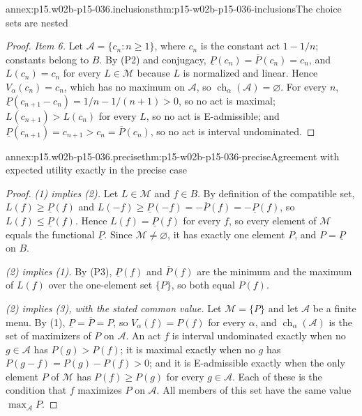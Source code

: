 \begin{annexitem}{annex:p15.w02b-p15-036.inclusions}{thm:p15-w02b-p15-036-inclusions}{The choice sets are nested}
\begin{proof}
\emph{Item 6.} Let \(\mathcal A=\{c_n:n\geq1\}\), where \(c_n\) is the
constant act \(1-1/n\); constants belong to \(B\). By (P2) and
conjugacy, \(\underline P(c_n)=\overline P(c_n)=c_n\), and
\(L(c_n)=c_n\) for every \(L\in\mathcal M\) because \(L\) is normalized and
linear. Hence \(V_\alpha(c_n)=c_n\), which has no maximum on
\(\mathcal A\), so \(\operatorname{ch}_\alpha(\mathcal A)=\varnothing\).
For every \(n\), \(\underline P(c_{n+1}-c_n)=1/n-1/(n+1)>0\), so no act is
maximal; \(L(c_{n+1})>L(c_n)\) for every \(L\), so no act is E-admissible;
and \(\underline P(c_{n+1})=c_{n+1}>c_n=\overline P(c_n)\), so no act is
interval undominated.
\end{proof}
\end{annexitem}

\begin{annexitem}{annex:p15.w02b-p15-036.precise}{thm:p15-w02b-p15-036-precise}{Agreement with expected utility exactly in the precise case}
\begin{proof}
\emph{(1) implies (2).} Let \(L\in\mathcal M\) and \(f\in B\). By
definition of the compatible set, \(L(f)\geq\underline P(f)\) and
\(L(-f)\geq\underline P(-f)=-\overline P(f)=-\underline P(f)\), so
\(L(f)\leq\underline P(f)\). Hence \(L(f)=\underline P(f)\) for every
\(f\), so every element of \(\mathcal M\) equals the functional
\(\underline P\). Since \(\mathcal M\ne\varnothing\), it has exactly one
element \(P\), and \(P=\underline P\) on \(B\).

\emph{(2) implies (1).} By (P3), \(\underline P(f)\) and
\(\overline P(f)\) are the minimum and the maximum of \(L(f)\) over the
one-element set \(\{P\}\), so both equal \(P(f)\).

\emph{(2) implies (3), with the stated common value.} Let
\(\mathcal M=\{P\}\) and let \(\mathcal A\) be a finite menu. By (1),
\(\underline P=\overline P=P\), so \(V_\alpha(f)=P(f)\) for every
\(\alpha\), and \(\operatorname{ch}_\alpha(\mathcal A)\) is the set of
maximizers of \(P\) on \(\mathcal A\). An act \(f\) is interval
undominated exactly when no \(g\in\mathcal A\) has \(P(g)>P(f)\); it is
maximal exactly when no \(g\) has \(P(g-f)=P(g)-P(f)>0\); and it is
E-admissible exactly when the only element \(P\) of \(\mathcal M\) has
\(P(f)\geq P(g)\) for every \(g\in\mathcal A\). Each of these is the
condition that \(f\) maximizes \(P\) on \(\mathcal A\). All members of
this set have the same value \(\max_{\mathcal A}P\).


\end{proof}
\end{annexitem}
